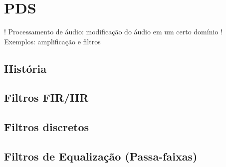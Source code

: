 \section{PDS}
! Processamento de áudio: modificação do áudio em um certo domínio
! Exemplos: amplificação e filtros
\subsection{História}
\subsection{Filtros FIR/IIR}
\subsection{Filtros discretos}
\subsection{Filtros de Equalização (Passa-faixas)}






